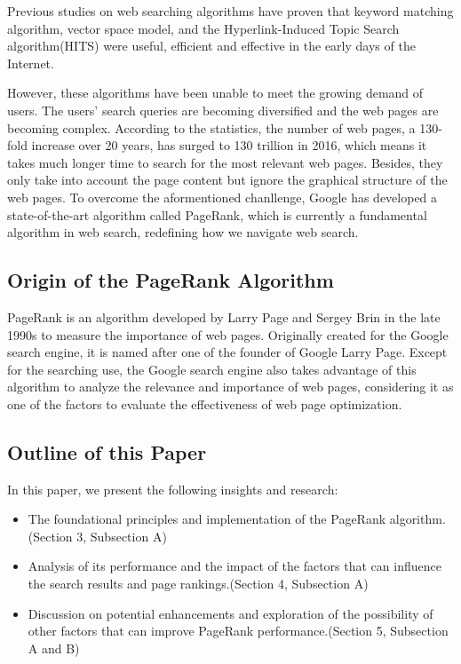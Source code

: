 \documentclass[lettersize,journal,12pt,conference]{IEEEtran}
\begin{document}
Previous studies on web searching algorithms have proven that keyword matching algorithm\cite{ref1}, vector space model\cite{ref2}, and the Hyperlink-Induced Topic Search algorithm(HITS)\cite{ref3} were useful, efficient and effective in the early days of the Internet.

However, these algorithms have been unable to meet the growing demand of users. The users' search queries are becoming diversified and the web pages are becoming complex. 
According to the statistics, the number of web pages, a 130-fold increase over 20 years, has surged to 130 trillion in 2016, which means it takes much longer time to search for the most relevant web pages.
Besides, they only take into account the page content but ignore the graphical structure of the web pages.
To overcome the aformentioned chanllenge, Google has developed a state-of-the-art algorithm called PageRank, which is currently a fundamental algorithm in web search, redefining how we navigate web search.

\subsection{Origin of the PageRank Algorithm} 

PageRank is an algorithm developed by Larry Page and Sergey Brin in the late 1990s to measure the importance of web pages.
Originally created for the Google search engine, it is named after one of the founder of Google Larry Page. Except for the searching use, the Google search engine also takes advantage of this algorithm to analyze the relevance and importance of web pages, considering it as one of the factors to evaluate the effectiveness of web page optimization.

\subsection{Outline of this Paper}

In this paper, we present the following insights and research:
\begin{itemize}
	\item The foundational principles and implementation of the PageRank algorithm.(Section 3, Subsection A)
	\item Analysis of its performance and the impact of the factors that can influence the search results and page rankings.(Section 4, Subsection A)
	\item Discussion on potential enhancements and exploration of the possibility of other factors that can improve PageRank performance.(Section 5, Subsection A and B)
\end{itemize}
\end{document}

